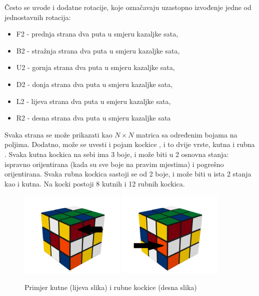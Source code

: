 \documentclass[times, utf8, seminar, numeric]{fer}
\begin{document}
Često se uvode i dodatne rotacije, koje označavaju uzastopno izvođenje jedne od jednostavnih rotacija:
\begin{itemize}
\item F2 - prednja strana dva puta u smjeru kazaljke sata, 
\item B2 - stražnja strana dva puta u smjeru kazaljke sata, 
\item U2 - gornja strana dva puta u smjeru kazaljke sata, 
\item D2 - donja strana dva puta u smjeru kazaljke sata, 
\item L2 - lijeva strana dva puta u smjeru kazaljke sata, 
\item R2 - desna strana dva puta u smjeru kazaljke sata
\end{itemize}


Svaka strana se može prikazati kao $N\times N$ matrica sa određenim bojama na poljima. Dodatno, može se uvesti i pojam kockice , i to dvije vrste, kutna  i rubna . Svaka kutna kockica na sebi ima 3 boje, i može biti u 2 osnovna stanja: ispravno orijentirana (kada su sve boje na pravim mjestima) i pogrešno orijentirana. Svaka rubna kockica sastoji se od 2 boje, i može biti u ista 2 stanja kao i kutna. 
Na kocki postoji 8 kutnih i 12 rubnih kockica.


\begin{figure}[h]
\centering
\includegraphics[width=0.45\textwidth]{image/corner_cubie.png}
\includegraphics[width=0.45\textwidth]{image/edge_cubie.png}
\caption{Primjer kutne (lijeva slika) i rubne kockice (desna slika) }
\end{figure}
\end{document}
